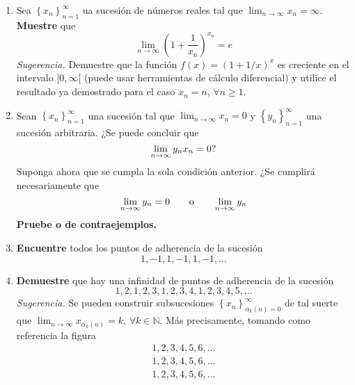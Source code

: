 \documentclass[12pt]{article}
\begin{document}
\begin{enumerate}
    \item Sea $\left\{x_n\right\}_{n=1}^{\infty}$ ua sucesión de números reales tal que $\lim_{n\rightarrow\infty}x_n=\infty$. \textbf{Muestre} que
        \begin{equation*}
            \lim_{n\rightarrow\infty}\left(1+\frac{1}{x_n}\right)^{x_n}=e
        \end{equation*}
        \textit{Sugerencia.} Demuestre que la función $f(x)=(1+1/x)^x$ es creciente en el intervalo $[0,\infty[$ (puede usar herramientas de cálculo diferencial) y utilice el resultado ya demostrado para el caso $x_n=n$, $\forall n\geq1$.
    \item Sean $\left\{x_n\right\}_{n=1}^{\infty}$ una sucesión  tal que $\lim_{n\rightarrow\infty}x_n=0$ y $\left\{y_n\right\}_{n=1}^{\infty}$ una sucesión arbitraria. ¿Se puede concluir que
        \begin{equation*}
            \lim_{n\rightarrow\infty}y_nx_n=0\textup{?}
        \end{equation*}
        Suponga ahora que se cumpla la sola condición anterior. ¿Se cumplirá necesariamente que
        \begin{equation*}
            \lim_{n\rightarrow\infty}y_n=0\qquad\textup{o}\qquad\lim_{n\rightarrow\infty}y_n
        \end{equation*}
        \textbf{Pruebe o de contraejemplos.}
    \item \textbf{Encuentre} todos los puntos de adherencia de la sucesión
        \begin{equation*}
            1,-1,1,-1,1,-1,\dots
        \end{equation*}
    \item \textbf{Demuestre} que hay una infinidad de puntos de adherencia de la sucesión
        \begin{equation*}
            1,2,1,2,3,1,2,3,4,1,2,3,4,5,\dots
        \end{equation*}
        \textit{Sugerencia.} Se pueden construir subsucesiones $\left\{x_n\right\}_{\alpha_k\left(n\right)=0}^{\infty}$ de tal suerte que $\lim_{n\rightarrow\infty}x_{\alpha_k\left(n\right)}=k$, $\forall k\in\mathbb{N}$. Más precisamente, tomando como referencia la figura
        \begin{equation*}
            \begin{split}
                1,2,3,4,5,6,\dots \\
                1,2,3,4,5,6,\dots \\
                1,2,3,4,5,6,\dots \\

\end{split}
\end{equation*}
\end{enumerate}
\end{document}
